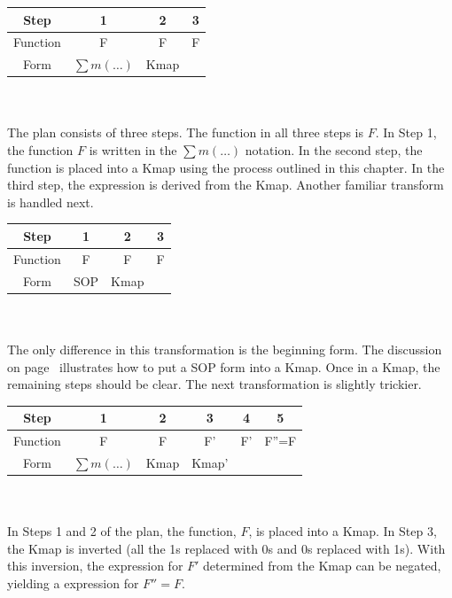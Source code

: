 \begin{process:minimizationKmap}
\begin{tabular}{|c|c|c|c|}\hline
Step	  & 1  & 2  & 3   \\ \hline
Function  & F  & F  & F \\ \hline
Form	  & $\sum m(\ldots)$ & Kmap & \SOPmin \\ \hline
\end{tabular}
\\ \\
The plan consists of three steps.  The function in all three steps is $F$.   
In Step 1, the function $F$ is written in the $\sum m(\ldots)$
notation.  In the second step, the function is placed into
a Kmap using the process outlined in this chapter. In the 
third step, the \SOPmin expression is derived from the Kmap.
Another familiar transform is handled next.

\begin{tabular}{|c|c|c|c|}\hline
Step	  & 1  & 2  & 3   \\ \hline
Function  & F  & F  & F \\ \hline
Form	  & SOP & Kmap & \SOPmin \\ \hline
\end{tabular}
\\ \\
The only difference in this transformation is the beginning 
form.  The discussion on page~\pageref{page:SymbToSymb} 
illustrates how to put a SOP form into a Kmap.  Once in a 
Kmap, the remaining steps should be clear.  The next 
transformation is slightly trickier.

\begin{tabular}{|c|c|c|c|c|c|}\hline
Step	  & 1  & 2  & 3  & 4  & 5   \\ \hline
Function  & F  & F  & F' & F' & F''=F \\ \hline
Form	  & $\sum m(\ldots)$ & Kmap & Kmap' & \SOPmin & \POSmin \\ \hline
\end{tabular}
\\ \\
In Steps 1 and 2 of the plan, the function, $F$, is placed into a Kmap.
In Step 3, the Kmap is inverted (all the 1s replaced with 0s and 
0s replaced with 1s).  With this inversion, the 
\SOPmin expression for $F'$ determined from the Kmap 
can be negated, yielding a \POSmin expression for $F''=F$.  


\end{process:minimizationKmap}
